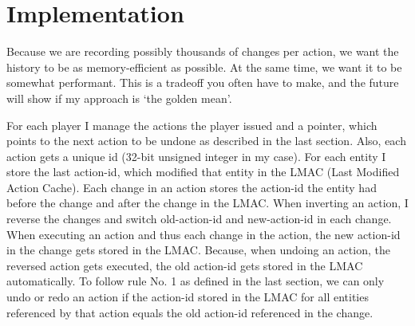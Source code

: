\documentclass[11pt]{article}
\begin{document}
    \section{Implementation}
    Because we are recording possibly thousands of changes per action, we want the history to be as memory-efficient as possible.
    At the same time, we want it to be somewhat performant.
    This is a tradeoff you often have to make, and the future will show if my approach is `the golden mean'.

    For each player I manage the actions the player issued and a pointer, which points to the next action to be
    undone as described in the last section.
    Also, each action gets a unique id (32-bit unsigned integer in my case).
    For each entity I store the last action-id, which modified that entity in the LMAC (Last Modified Action Cache).
    Each change in an action stores the action-id the entity had before the change and after the change in the LMAC.
    When inverting an action, I reverse the changes and switch old-action-id and new-action-id in each change.
    When executing an action and thus each change in the action, the new action-id in the change gets stored in the LMAC.
    Because, when undoing an action, the reversed action gets executed, the old action-id gets stored in the LMAC automatically.
    To follow rule No. 1 as defined in the last section, we can only undo or redo an action if
    the action-id stored in the LMAC for all entities referenced by that action equals the old action-id referenced in the change.
\end{document}
